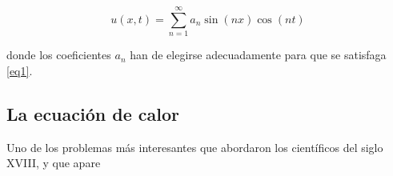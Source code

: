 \begin{equation}\label{eq4}
	u(x,t) = \sum_{n=1}^{\infty} a_n \sin(nx) \cos(nt)
\end{equation}
\newline

donde los coeficientes \( a_n \) han de elegirse adecuadamente para que se satisfaga
\ref{eq1}.
\newline

\subsection{La ecuación de calor}

Uno de los problemas más interesantes que abordaron los científicos del siglo XVIII, y que apare


%
%
